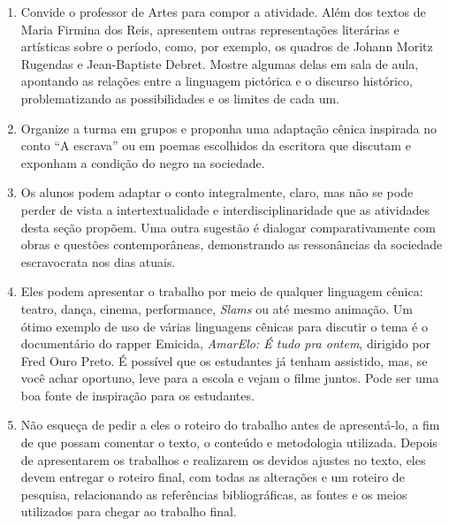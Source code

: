 \documentclass[12pt]{extarticle}
\begin{document}
\begin{enumerate}
\item
Convide o professor de Artes para compor a atividade. 
Além dos textos de Maria Firmina dos Reis, apresentem outras 
representações literárias e artísticas sobre o período,
como, por exemplo, os quadros de Johann Moritz Rugendas e Jean-Baptiste
Debret. Mostre algumas delas em sala de aula, apontando as relações
entre a linguagem pictórica e o discurso histórico, problematizando as
possibilidades e os limites de cada um.






\item
Organize a turma em grupos e proponha uma adaptação cênica inspirada
no conto ``A escrava'' ou em poemas escolhidos da escritora que discutam
e exponham a condição do negro na sociedade.

\item
Os alunos podem adaptar o conto integralmente, claro, mas não se pode
perder de vista a intertextualidade e interdisciplinaridade que as
atividades desta seção propõem. Uma outra sugestão é dialogar
comparativamente com obras e questões contemporâneas, demonstrando as
ressonâncias da sociedade escravocrata nos dias atuais.

\item
Eles podem apresentar o trabalho por meio de qualquer linguagem
cênica: teatro, dança, cinema, performance, \emph{Slams} ou até mesmo
animação. Um ótimo exemplo de uso de várias linguagens cênicas para
discutir o tema é o documentário do rapper Emicida, \emph{AmarElo: É
tudo pra ontem}, dirigido por Fred Ouro Preto. É possível que os
estudantes já tenham assistido, mas, se você achar oportuno, leve para a
escola e vejam o filme juntos. Pode ser uma boa fonte de inspiração para
os estudantes.

\item
Não esqueça de pedir a eles o roteiro do trabalho antes de
apresentá-lo, a fim de que possam comentar o texto, o conteúdo e
metodologia utilizada. Depois de apresentarem os trabalhos e realizarem
os devidos ajustes no texto, eles devem entregar o roteiro final, com
todas as alterações e um roteiro de pesquisa, relacionando as
referências bibliográficas, as fontes e os meios utilizados para chegar
ao trabalho final.
\end{enumerate}
\end{document}
